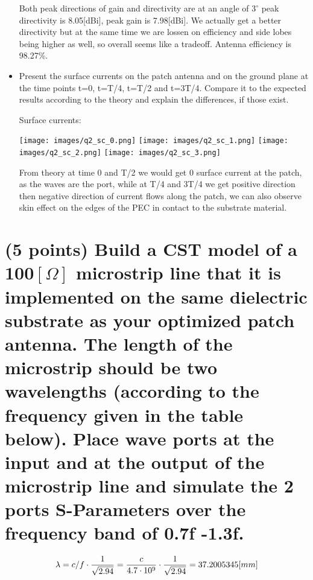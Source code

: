 \documentclass[12pt, letterpaper]{article}
\begin{document}
\begin{itemize}
  {\color{blue}Both peak directions of gain and directivity are at an angle of $3^\circ$ peak directivity is 8.05[dBi], peak gain is 7.98[dBi]. We actually get a better directivity but at the same time we are lossen on efficiency and side lobes being higher as well, so overall seems like a tradeoff. Antenna efficiency is 98.27\%.}



  \item Present the surface currents on the patch antenna and on the ground plane at the time points t=0, t=T/4, t=T/2 and t=3T/4. Compare it to the expected results according to the theory and explain the differences, if those exist.

  \begin{center}
    Surface currents:
  \end{center}
  \texttt{[image: images/q2\_sc\_0.png]}
  \texttt{[image: images/q2\_sc\_1.png]}
  \texttt{[image: images/q2\_sc\_2.png]}
  \texttt{[image: images/q2\_sc\_3.png]}

  {\color{blue}From theory at time 0 and T/2 we would get 0 surface current at the patch, as the waves are the port, while at T/4 and 3T/4 we get positive direction then negative direction of current flows along the patch, we can also observe skin effect on the edges of the PEC in contact to the substrate material.}
\end{itemize}

\section{(5 points) Build a CST model of a 100$[\Omega]$ microstrip line that it is implemented on the same dielectric substrate as your optimized patch antenna. The length of the microstrip should be two wavelengths (according to the frequency given in the table below). Place wave ports at the input and at the output of the microstrip line and simulate the 2 ports S-Parameters over the frequency band of 0.7f -1.3f.}

\begin{align}
  \lambda=c/f\cdot{1\over\sqrt{2.94}}={c\over4.7\cdot10^9}\cdot{1\over\sqrt{2.94}}=37.2005345[mm]
\end{align}
\end{document}

